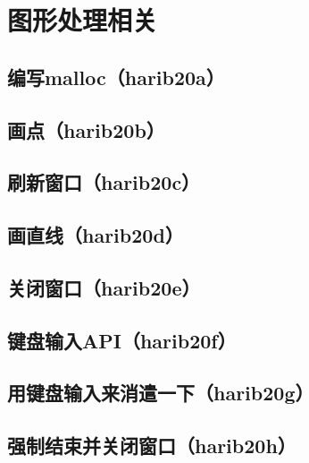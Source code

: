 ﻿\chapter{	图形处理相关	}
\section{	编写malloc（harib20a）	}
\section{	画点（harib20b）	}
\section{	刷新窗口（harib20c）	}
\section{	画直线（harib20d）	}
\section{	关闭窗口（harib20e）	}
\section{	键盘输入API（harib20f）	}
\section{	用键盘输入来消遣一下（harib20g）	}
\section{	强制结束并关闭窗口（harib20h）	}

